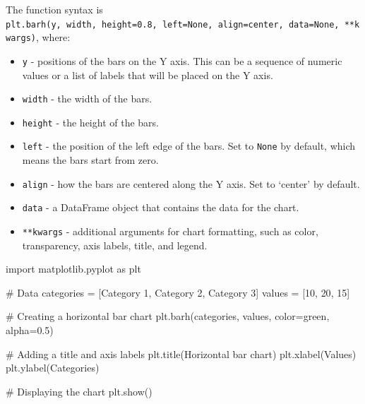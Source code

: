 \documentclass[
  english,
  letterpaper,
  DIV=11,
  numbers=noendperiod]{scrreprt}
\newenvironment{Shaded}{\begin{snugshade}}{\end{snugshade}}
\newcommand{\CommentTok}[1]{\textcolor[rgb]{0.37,0.37,0.37}{#1}}
\newcommand{\DecValTok}[1]{\textcolor[rgb]{0.68,0.00,0.00}{#1}}
\newcommand{\FloatTok}[1]{\textcolor[rgb]{0.68,0.00,0.00}{#1}}
\newcommand{\ImportTok}[1]{\textcolor[rgb]{0.00,0.46,0.62}{#1}}
\newcommand{\NormalTok}[1]{\textcolor[rgb]{0.00,0.23,0.31}{#1}}
\newcommand{\OperatorTok}[1]{\textcolor[rgb]{0.37,0.37,0.37}{#1}}
\newcommand{\StringTok}[1]{\textcolor[rgb]{0.13,0.47,0.30}{#1}}
\providecommand{\tightlist}{%
  \setlength{\itemsep}{0pt}\setlength{\parskip}{0pt}}
\begin{document}
The function syntax is
\texttt{plt.barh(y,\ width,\ height=0.8,\ left=None,\ align=\textquotesingle{}center\textquotesingle{},\ data=None,\ **kwargs)},
where:

\begin{itemize}
\tightlist
\item
  \texttt{y} - positions of the bars on the Y axis. This can be a
  sequence of numeric values or a list of labels that will be placed on
  the Y axis.
\item
  \texttt{width} - the width of the bars.
\item
  \texttt{height} - the height of the bars.
\item
  \texttt{left} - the position of the left edge of the bars. Set to
  \texttt{None} by default, which means the bars start from zero.
\item
  \texttt{align} - how the bars are centered along the Y axis. Set to
  `center' by default.
\item
  \texttt{data} - a DataFrame object that contains the data for the
  chart.
\item
  \texttt{**kwargs} - additional arguments for chart formatting, such as
  color, transparency, axis labels, title, and legend.
\end{itemize}

\begin{Shaded}
\begin{Highlighting}[]
\ImportTok{import}\NormalTok{ matplotlib.pyplot }\ImportTok{as}\NormalTok{ plt}

\CommentTok{\# Data}
\NormalTok{categories }\OperatorTok{=}\NormalTok{ [}\StringTok{\textquotesingle{}Category 1\textquotesingle{}}\NormalTok{, }\StringTok{\textquotesingle{}Category 2\textquotesingle{}}\NormalTok{, }\StringTok{\textquotesingle{}Category 3\textquotesingle{}}\NormalTok{]}
\NormalTok{values }\OperatorTok{=}\NormalTok{ [}\DecValTok{10}\NormalTok{, }\DecValTok{20}\NormalTok{, }\DecValTok{15}\NormalTok{]}

\CommentTok{\# Creating a horizontal bar chart}
\NormalTok{plt.barh(categories, values, color}\OperatorTok{=}\StringTok{\textquotesingle{}green\textquotesingle{}}\NormalTok{, alpha}\OperatorTok{=}\FloatTok{0.5}\NormalTok{)}

\CommentTok{\# Adding a title and axis labels}
\NormalTok{plt.title(}\StringTok{\textquotesingle{}Horizontal bar chart\textquotesingle{}}\NormalTok{)}
\NormalTok{plt.xlabel(}\StringTok{\textquotesingle{}Values\textquotesingle{}}\NormalTok{)}
\NormalTok{plt.ylabel(}\StringTok{\textquotesingle{}Categories\textquotesingle{}}\NormalTok{)}

\CommentTok{\# Displaying the chart}
\NormalTok{plt.show()}
\end{Highlighting}
\end{Shaded}
\end{document}
